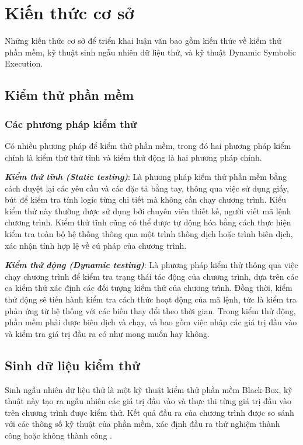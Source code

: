\section{Kiến thức cơ sở}
Những kiến thức cơ sở để triển khai luận văn bao gồm kiến thức về kiểm thử phần mềm, kỹ thuật sinh ngẫu nhiên dữ liệu thử, và kỹ thuật Dynamic Symbolic Execution.

\subsection{Kiểm thử phần mềm}
\subsubsection{Các phương pháp kiểm thử}
Có nhiều phương pháp để kiểm thử phần mềm, trong đó hai phương pháp kiểm chính là kiểm thử thử tĩnh và kiểm thử động là hai phương pháp chính.

\textbf{\textit{Kiểm thử tĩnh (Static testing)}}: Là phương pháp kiểm thử phần mềm bằng cách duyệt lại các yêu cầu và các đặc tả bằng tay, thông qua việc sử dụng giấy, bút để kiểm tra tính logic từng chi tiết mà không cần chạy chương trình. Kiểu kiểm thử này thường được sử dụng bởi chuyên viên thiết kế, người viết mã lệnh chương trình. Kiểm thử tĩnh cũng có thể được tự động hóa bằng cách thực hiện kiểm tra toàn bộ hệ thống thông qua một trình thông dịch hoặc trình biên dịch, xác nhận tính hợp lệ về cú pháp của chương trình.
		
\textbf{\textit{Kiểm thử động (Dynamic testing)}}: Là phương pháp kiểm thử thông qua việc chạy chương trình để kiểm tra trạng thái tác động của chương trình, dựa trên các ca kiểm thử xác định các đối tượng kiểm thử của chương trình. Đồng thời, kiểm thử động sẽ tiến hành kiểm tra cách thức hoạt động của mã lệnh, tức là kiểm tra phản ứng từ hệ thống với các biến thay đổi theo thời gian. Trong kiểm thử động, phần mềm phải được biên dịch và chạy, và bao gồm việc nhập các giá trị đầu vào và kiểm tra giá trị đầu ra có như mong muốn hay không.	
	
\subsection{Sinh dữ liệu kiểm thử}
Sinh ngẫu nhiên dữ liệu thử là một kỹ thuật kiểm thử phần mềm Black-Box, kỹ thuật này tạo ra ngẫu nhiên các giá trị đầu vào và thực thi từng giá trị đầu vào trên chương trình được kiểm thử. Kết quả đầu ra của chương trình được so sánh với các thông số kỹ thuật của phần mềm, xác định đầu ra thử nghiệm thành công hoặc không thành công \cite{myers2011art}.  

